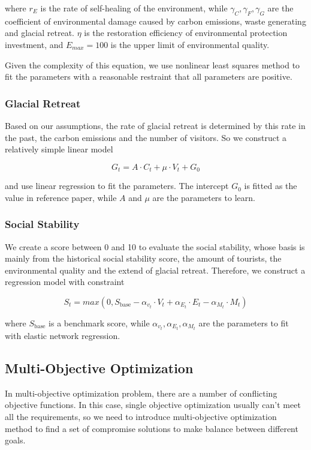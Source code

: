 \documentclass{mcmthesis}
\begin{document}
where $r_E$ is the rate of self-healing of the environment, while $\gamma_C, \gamma_F, \gamma_G$ are the coefficient of 
environmental damage caused by carbon emissions, waste generating and glacial retreat. $\eta$ is the restoration efficiency of 
environmental protection investment, and $E_{max} = 100$ is the upper limit of environmental quality.

Given the complexity of this equation, we use nonlinear least squares method to fit the parameters with 
a reasonable restraint that all parameters are positive.


\subsubsection{Glacial Retreat}
Based on our assumptions, the rate of glacial retreat is determined by this rate in the past, the carbon emissions and the number of visitors.
So we construct a relatively simple linear model

\begin{equation}
  G_t = A \cdot C_t + \mu \cdot V_t + G_0
\end{equation}

and use linear regression to fit the parameters. The intercept $G_0$ is fitted as the value in reference paper, 
while $A$ and $\mu$ are the parameters to learn.

\subsubsection{Social Stability}
We create a score between 0 and 10 to evaluate the social stability, whose basis is mainly from 
the historical social stability score, the amount of tourists, the environmental quality and the extend of glacial retreat.
Therefore, we construct a regression model with constraint

\begin{equation}
  S_t = max\left(0, S_{\text{base}} - \alpha_{v_t} \cdot V_t + \alpha_{E_t} \cdot E_t - \alpha_{M_t} \cdot M_t\right)
\end{equation}

where $S_{\text{base}}$ is a benchmark score, while $\alpha_{v_t}, \alpha_{E_t}, \alpha_{M_t}$ are the parameters to fit 
with elastic network regression.

\subsection{Multi-Objective Optimization}
In multi-objective optimization problem, there are a number of conflicting objective functions. In this case, 
single objective optimization usually can't meet all the requirements, so we need to introduce multi-objective 
optimization method to find a set of compromise solutions to make balance between different goals.
\end{document}
